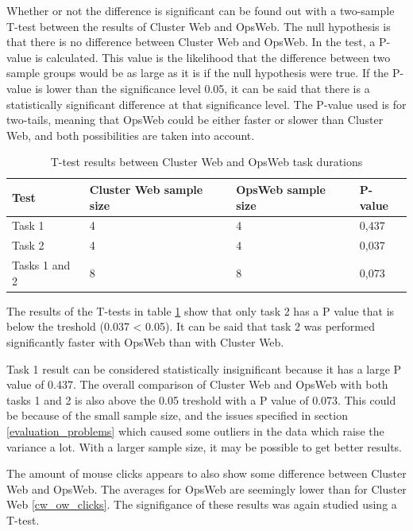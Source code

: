 Whether or not the difference is significant can be found out with a two-sample T-test between the results of Cluster Web and OpsWeb. The null hypothesis is that there is no difference between Cluster Web and OpsWeb. In the test, a P-value is calculated. This value is the likelihood that the difference between two sample groups would be as large as it is if the null hypothesis were true. If the P-value is lower than the significance level 0.05, it can be said that there is a statistically significant difference at that significance level. The P-value used is for two-tails, meaning that OpsWeb could be either faster or slower than Cluster Web, and both possibilities are taken into account.

\begin{table}[!ht]
\def\arraystretch{1.1}%
    \begin{center}
    \caption{T-test results between Cluster Web and OpsWeb task durations}
    \label{cw_ow_times_t_test}
    \begin{tabular}{| l | l | l | l | }
    \hline
    Test & Cluster Web sample size & OpsWeb sample size  & P-value   \\
    \hline
    Task 1 & 4 & 4 & 0,437 \\
    Task 2 & 4 & 4 &  0,037\\
    Tasks 1 and 2 & 8 & 8 & 0,073\\
    \hline
    \end{tabular}
    \end{center}
\end{table}

The results of the T-tests in table \ref{cw_ow_times_t_test} show that only task 2 has a P value that is below the treshold (0.037 < 0.05). It can be said that task 2 was performed significantly faster with OpsWeb than with Cluster Web.

Task 1 result can be considered statistically insignificant because it has a large P value of 0.437. The overall comparison of Cluster Web and OpsWeb with both tasks 1 and 2 is also above the 0.05 treshold with a P value of 0.073. This could be because of the small sample size, and the issues specified in section \ref{evaluation_problems} which caused some outliers in the data which raise the variance a lot. With a larger sample size, it may be possible to get better results.

The amount of mouse clicks appears to also show some difference between Cluster Web and OpsWeb. The averages for OpsWeb are seemingly lower than for Cluster Web \ref{cw_ow_clicks}. The signifigance of these results was again studied using a T-test.

